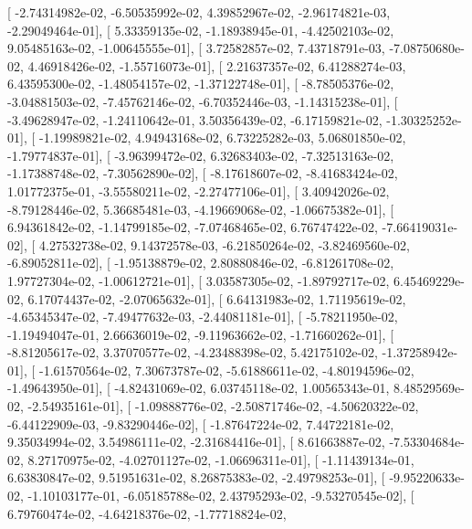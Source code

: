 \documentclass{article}
\begin{document}
       [ -2.74314982e-02,  -6.50535992e-02,   4.39852967e-02,
         -2.96174821e-03,  -2.29049464e-01],
       [  5.33359135e-02,  -1.18938945e-01,  -4.42502103e-02,
          9.05485163e-02,  -1.00645555e-01],
       [  3.72582857e-02,   7.43718791e-03,  -7.08750680e-02,
          4.46918426e-02,  -1.55716073e-01],
       [  2.21637357e-02,   6.41288274e-03,   6.43595300e-02,
         -1.48054157e-02,  -1.37122748e-01],
       [ -8.78505376e-02,  -3.04881503e-02,  -7.45762146e-02,
         -6.70352446e-03,  -1.14315238e-01],
       [ -3.49628947e-02,  -1.24110642e-01,   3.50356439e-02,
         -6.17159821e-02,  -1.30325252e-01],
       [ -1.19989821e-02,   4.94943168e-02,   6.73225282e-03,
          5.06801850e-02,  -1.79774837e-01],
       [ -3.96399472e-02,   6.32683403e-02,  -7.32513163e-02,
         -1.17388748e-02,  -7.30562890e-02],
       [ -8.17618607e-02,  -8.41683424e-02,   1.01772375e-01,
         -3.55580211e-02,  -2.27477106e-01],
       [  3.40942026e-02,  -8.79128446e-02,   5.36685481e-03,
         -4.19669068e-02,  -1.06675382e-01],
       [  6.94361842e-02,  -1.14799185e-02,  -7.07468465e-02,
          6.76747422e-02,  -7.66419031e-02],
       [  4.27532738e-02,   9.14372578e-03,  -6.21850264e-02,
         -3.82469560e-02,  -6.89052811e-02],
       [ -1.95138879e-02,   2.80880846e-02,  -6.81261708e-02,
          1.97727304e-02,  -1.00612721e-01],
       [  3.03587305e-02,  -1.89792717e-02,   6.45469229e-02,
          6.17074437e-02,  -2.07065632e-01],
       [  6.64131983e-02,   1.71195619e-02,  -4.65345347e-02,
         -7.49477632e-03,  -2.44081181e-01],
       [ -5.78211950e-02,  -1.19494047e-01,   2.66636019e-02,
         -9.11963662e-02,  -1.71660262e-01],
       [ -8.81205617e-02,   3.37070577e-02,  -4.23488398e-02,
          5.42175102e-02,  -1.37258942e-01],
       [ -1.61570564e-02,   7.30673787e-02,  -5.61886611e-02,
         -4.80194596e-02,  -1.49643950e-01],
       [ -4.82431069e-02,   6.03745118e-02,   1.00565343e-01,
          8.48529569e-02,  -2.54935161e-01],
       [ -1.09888776e-02,  -2.50871746e-02,  -4.50620322e-02,
         -6.44122909e-03,  -9.83290446e-02],
       [ -1.87647224e-02,   7.44722181e-02,   9.35034994e-02,
          3.54986111e-02,  -2.31684416e-01],
       [  8.61663887e-02,  -7.53304684e-02,   8.27170975e-02,
         -4.02701127e-02,  -1.06696311e-01],
       [ -1.11439134e-01,   6.63830847e-02,   9.51951631e-02,
          8.26875383e-02,  -2.49798253e-01],
       [ -9.95220633e-02,  -1.10103177e-01,  -6.05185788e-02,
          2.43795293e-02,  -9.53270545e-02],
       [  6.79760474e-02,  -4.64218376e-02,  -1.77718824e-02,
\end{document}
